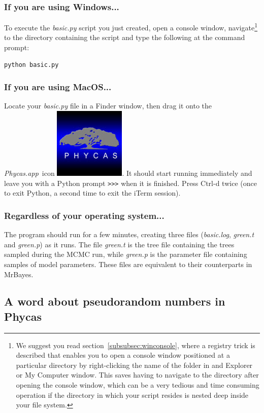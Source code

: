 \documentclass[10pt]{article}
\newcommand{\pathname}[1]{{\em #1}}				%
\newcommand{\keycmd}[1]{{\sf #1}}					%
\newcommand{\code}[1]{{\tt #1}}					%
\newcommand{\phycasapp}{\pathname{Phycas.app}}
\newcommand{\phycasicon}{\includegraphics[scale=0.2]{images/PhycasGUI}}
\begin{document}
\subsubsection{If you are using Windows...} 

To execute the \pathname{basic.py} script you just created, open a console window, navigate\footnote{We suggest you read section~\ref{subsubsec:winconsole}, where a registry trick is described that enables you to open a console window positioned at a particular directory by right-clicking the name of the folder in and Explorer or My Computer window. This saves having to navigate to the directory after opening the console window, which can be a very tedious and time consuming operation if the directory in which your script resides is nested deep inside your file system.} to the directory containing the script and type the following at the command prompt:
%
\begin{verbatim}
python basic.py
\end{verbatim}

\subsubsection{If you are using MacOS...} 

Locate your \pathname{basic.py} file in a Finder window, then drag it onto the \phycasapp\ icon \phycasicon. It should start running immediately and leave you with a Python prompt \code{>>>} when it is finished. Press \keycmd{Ctrl-d} twice (once to exit Python, a second time to exit the iTerm session).

\subsubsection{Regardless of your operating system...} 

The program should run for a few minutes, creating three files (\pathname{basic.log}, \pathname{green.t} and \pathname{green.p}) as it runs. The file \pathname{green.t} is the tree file containing the trees sampled during the MCMC run, while \pathname{green.p} is the parameter file containing samples of model parameters. These files are equivalent to their counterparts in MrBayes.

\subsection{A word about pseudorandom numbers in Phycas} \label{subsec:rng}
\end{document}
